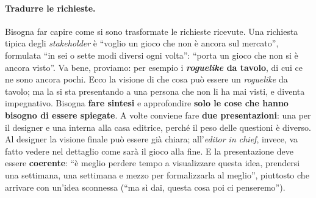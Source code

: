 \paragraph{Tradurre le richieste.} Bisogna far capire come si sono trasformate le
richieste ricevute. Una richiesta tipica degli \emph{stakeholder} è ``voglio un gioco che
non è ancora sul mercato'', formulata ``in sei o sette modi diversi ogni volta'': ``porta un
gioco che non si è ancora visto''. Va bene, proviamo: per esempio i \textbf{\emph{roguelike}
da tavolo}, di cui ce ne sono ancora pochi. Ecco la visione di che cosa può essere un
\emph{roguelike} da tavolo; ma la si sta presentando a una persona che non li ha mai visti,
e diventa impegnativo. Bisogna \textbf{fare sintesi} e approfondire \textbf{solo le cose che
hanno bisogno di essere spiegate}. A volte conviene fare \textbf{due presentazioni}: una per
il designer e una interna alla casa editrice, perché il peso delle questioni è diverso. Al
designer la visione finale può essere già chiara; all'\emph{editor in chief}, invece, va
fatto vedere nel dettaglio come sarà il gioco alla fine. E la presentazione deve essere
\textbf{coerente}: ``è meglio perdere tempo a visualizzare questa idea, prendersi una
settimana, una settimana e mezzo per formalizzarla al meglio'', piuttosto che arrivare con
un'idea sconnessa (``ma sì dai, questa cosa poi ci penseremo'').

